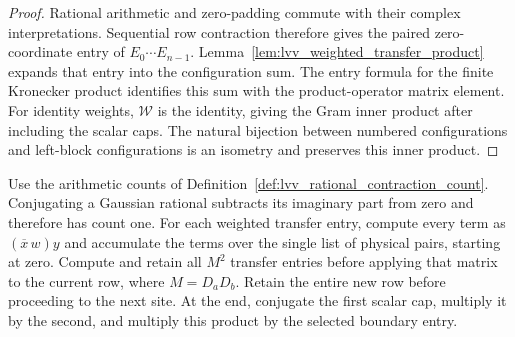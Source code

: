 \begin{proof}\leanok
    Rational arithmetic and zero-padding commute with their complex
    interpretations. Sequential row contraction therefore gives the
    paired zero-coordinate entry of $E_0\cdots E_{n-1}$.
    Lemma~\ref{lem:lvv_weighted_transfer_product} expands that entry
    into the configuration sum. The entry formula for the finite
    Kronecker product identifies this sum with the product-operator
    matrix element. For identity weights, $\mathcal W$ is the identity,
    giving the Gram inner product after including the scalar caps.
    The natural bijection between numbered configurations and left-block
    configurations is an isometry and preserves this inner product.
\end{proof}

\begin{definition}
    \label{def:lvv_rational_weighted_overlap_count}
    \leanok
    Use the arithmetic counts of
    Definition~\ref{def:lvv_rational_contraction_count}.
    Conjugating a Gaussian rational subtracts its imaginary part from
    zero and therefore has count one. For each weighted transfer entry,
    compute every term as $(\overline{x}\,w)y$ and accumulate the terms
    over the single list of physical pairs, starting at zero.
    Compute and retain all $M^2$ transfer entries before applying that
    matrix to the current row, where $M=D_aD_b$.
    Retain the entire new row before proceeding to the next site.
    At the end, conjugate the first scalar cap, multiply it by the second,
    and multiply this product by the selected boundary entry.
\end{definition}

